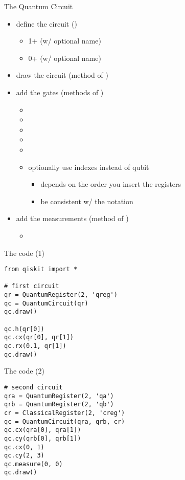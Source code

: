 \begin{frame}{The Quantum Circuit}
\begin{itemize}
    \item<1-> define the circuit ()
    \begin{itemize}
        \item<2-> 1+  (w/ optional name)
        \item<3-> 0+  (w/ optional name)
    \end{itemize}
    \item<4-> draw the circuit (method  of )
    \item<5-> add the gates (methods of )
    \begin{itemize}
        \item<6-> 
        \item<8-> 
        \item<9-> 
        \item<10-> 
        \item<11-> 
        \item<12-> optionally use indexes instead of qubit
        \begin{itemize}
            \item<13-> depends on the order you insert the registers
            \item<14-> be consistent w/ the notation
        \end{itemize}
    \end{itemize}
    \item<15-> add the measurements (method of )
    \begin{itemize}
        \item<15-> 
    \end{itemize}
\end{itemize}
\end{frame}


\begin{frame}[fragile]{The code (1)}
\begin{verbatim}
from qiskit import *

# first circuit
qr = QuantumRegister(2, 'qreg')
qc = QuantumCircuit(qr)
qc.draw()

qc.h(qr[0])
qc.cx(qr[0], qr[1])
qc.rx(0.1, qr[1])
qc.draw()
\end{verbatim}
\end{frame}


\begin{frame}[fragile]{The code (2)}
\begin{verbatim}
# second circuit
qra = QuantumRegister(2, 'qa')
qrb = QuantumRegister(2, 'qb')
cr = ClassicalRegister(2, 'creg')
qc = QuantumCircuit(qra, qrb, cr)
qc.cx(qra[0], qra[1])
qc.cy(qrb[0], qrb[1])
qc.cx(0, 1)
qc.cy(2, 3)
qc.measure(0, 0)
qc.draw()
\end{verbatim}
\end{frame}